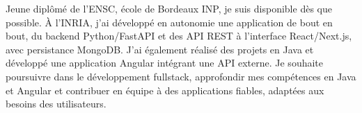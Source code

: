 
\begin{cvparagraph}
Jeune diplômé de l’ENSC, école de Bordeaux INP, je suis disponible dès que possible. À l’INRIA, j’ai développé en autonomie une application de bout en bout, du backend Python/FastAPI et des API REST à l’interface React/Next.js, avec persistance MongoDB. J’ai également réalisé des projets en Java et développé une application Angular intégrant une API externe. Je souhaite poursuivre dans le développement fullstack, approfondir mes compétences en Java et Angular et contribuer en équipe à des applications fiables, adaptées aux besoins des utilisateurs.
\end{cvparagraph}
